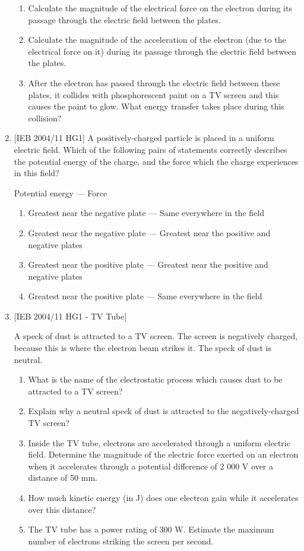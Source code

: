 \begin{eocexercises}{}
\begin{enumerate}
{\begin{enumerate}
\item{Calculate the magnitude of the electrical force on the electron during its passage through the electric field between the plates.}

\item{Calculate the magnitude of the acceleration of the electron (due to the electrical force on it) during its passage through the electric field between the plates.}

\item{After the electron has passed through the electric field between these plates, it collides with phosphorescent paint on a TV screen and this causes the paint to glow. What energy transfer takes place during this collision?}
\end{enumerate}}

\item{[IEB 2004/11 HG1] A positively-charged particle is placed in a uniform electric field. Which of the following pairs of statements correctly describes the potential energy of the charge, and the force which the charge experiences in this field?

Potential energy --- Force
\begin{enumerate}
\item{Greatest near the negative plate --- Same everywhere in the field}
\item{Greatest near the negative plate --- Greatest near the positive and negative plates}
\item{Greatest near the positive plate --- Greatest near the positive and negative plates}
\item{Greatest near the positive plate --- Same everywhere in the field}
\end{enumerate}
}

\item{[IEB 2004/11 HG1 - TV Tube]

A speck of dust is attracted to a TV screen. The screen is
negatively charged, because this is where the electron beam
strikes it. The speck of dust is neutral.

\begin{enumerate}
\item{What is the name of the electrostatic process which causes dust to be attracted to a TV screen?}
\item{Explain why a neutral speck of dust is attracted to the negatively-charged TV screen?}
\item{Inside the TV tube, electrons are accelerated through a uniform electric field. Determine the magnitude of the electric force exerted on an electron when it accelerates through a potential difference of 2 000 V over a distance of 50 mm.}
\item{How much kinetic energy (in J) does one electron gain while it accelerates over this distance?}
\item{The TV tube has a power rating of 300 W. Estimate the maximum number of electrons striking the screen per second.}
\end{enumerate}}


\end{enumerate}
\end{eocexercises}
